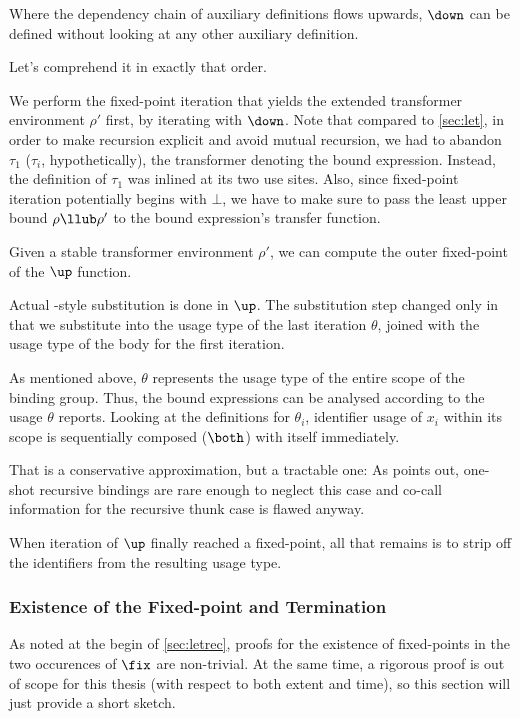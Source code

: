 Where the dependency chain of auxiliary definitions flows upwards, \eg $\down$ can be defined without looking at any other auxiliary definition.

Let's comprehend it in exactly that order.

We perform the fixed-point iteration that yields the extended transformer environment $\rho'$ first, by iterating with $\down$.
Note that compared to \cref{sec:let}, in order to make recursion explicit and avoid mutual recursion, we had to abandon $\tau_1$ ($\tau_i$, hypothetically), the transformer denoting the bound expression.
Instead, the definition of $\tau_1$ was inlined at its two use sites.
Also, since fixed-point iteration potentially begins with $\bot$, we have to make sure to pass the least upper bound $\rho \llub \rho'$ to the bound expression's transfer function.

Given a stable transformer environment $\rho'$, we can compute the outer fixed-point of the $\up$ function.

Actual -style substitution is done in $\up$.
The substitution step changed only in that we substitute into the usage type of the last iteration $\theta$, joined with the usage type of the body for the first iteration.

As mentioned above, $\theta$ represents the usage type of the entire scope of the binding group.
Thus, the bound expressions can be analysed according to the usage $\theta$ reports.
Looking at the definitions for $\theta_i$, identifier usage of $x_i$ within its scope is sequentially composed ($\both$) with itself immediately.

That is a conservative approximation, but a tractable one:
As \textcite[102--104]{callarity} points out, one-shot recursive bindings are rare enough to neglect this case and co-call information for the recursive thunk case is flawed anyway.

When iteration of $\up$ finally reached a fixed-point, all that remains is to strip off the identifiers from the resulting usage type.

\subsubsection{Existence of the Fixed-point and Termination}\label{sec:fix}

As noted at the begin of \cref{sec:letrec}, proofs for the existence of fixed-points in the two occurences of $\fix$ are non-trivial. 
At the same time, a rigorous proof is out of scope for this thesis (with respect to both extent and time), so this section will just provide a short sketch.\medskip

